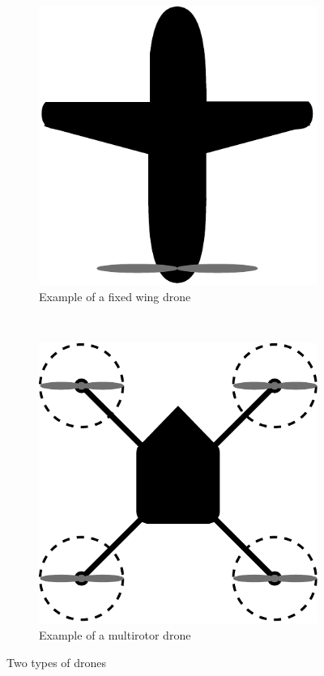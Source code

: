 \begin{figure}[h]
\centering
    \begin{subfigure}[h]{0.45\textwidth}
        \includegraphics[width=\textwidth]{figures/PA/Fixedwing.pdf}
        \caption{Example of a fixed wing drone}
        \label{fig:fixedwing}
    \end{subfigure}
    ~
    \begin{subfigure}[h]{0.45\textwidth}
        \includegraphics[width=\textwidth]{figures/PA/Quadcopter.pdf}
        \caption{Example of a multirotor drone}
        \label{fig:multirotor}
    \end{subfigure}
    \caption{Two types of drones}
    \label{fig:drones_type}
\end{figure}

